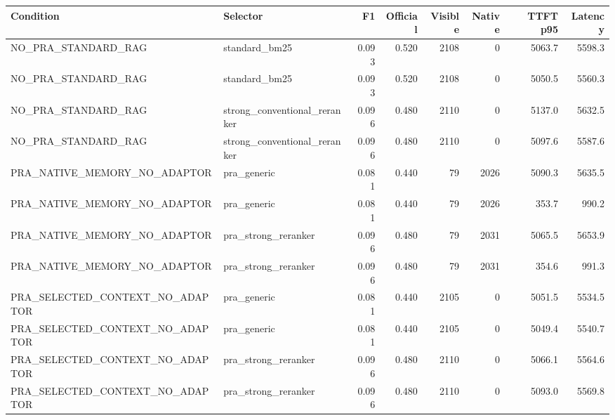 \begin{tabular}{llrrrrrr}
\toprule
Condition & Selector & F1 & Official & Visible & Native & TTFT p95 & Latency \\
\midrule
NO\_PRA\_STANDARD\_RAG & standard\_bm25 & 0.093 & 0.520 & 2108 & 0 & 5063.7 & 5598.3 \\
NO\_PRA\_STANDARD\_RAG & standard\_bm25 & 0.093 & 0.520 & 2108 & 0 & 5050.5 & 5560.3 \\
NO\_PRA\_STANDARD\_RAG & strong\_conventional\_reranker & 0.096 & 0.480 & 2110 & 0 & 5137.0 & 5632.5 \\
NO\_PRA\_STANDARD\_RAG & strong\_conventional\_reranker & 0.096 & 0.480 & 2110 & 0 & 5097.6 & 5587.6 \\
PRA\_NATIVE\_MEMORY\_NO\_ADAPTOR & pra\_generic & 0.081 & 0.440 & 79 & 2026 & 5090.3 & 5635.5 \\
PRA\_NATIVE\_MEMORY\_NO\_ADAPTOR & pra\_generic & 0.081 & 0.440 & 79 & 2026 & 353.7 & 990.2 \\
PRA\_NATIVE\_MEMORY\_NO\_ADAPTOR & pra\_strong\_reranker & 0.096 & 0.480 & 79 & 2031 & 5065.5 & 5653.9 \\
PRA\_NATIVE\_MEMORY\_NO\_ADAPTOR & pra\_strong\_reranker & 0.096 & 0.480 & 79 & 2031 & 354.6 & 991.3 \\
PRA\_SELECTED\_CONTEXT\_NO\_ADAPTOR & pra\_generic & 0.081 & 0.440 & 2105 & 0 & 5051.5 & 5534.5 \\
PRA\_SELECTED\_CONTEXT\_NO\_ADAPTOR & pra\_generic & 0.081 & 0.440 & 2105 & 0 & 5049.4 & 5540.7 \\
PRA\_SELECTED\_CONTEXT\_NO\_ADAPTOR & pra\_strong\_reranker & 0.096 & 0.480 & 2110 & 0 & 5066.1 & 5564.6 \\
PRA\_SELECTED\_CONTEXT\_NO\_ADAPTOR & pra\_strong\_reranker & 0.096 & 0.480 & 2110 & 0 & 5093.0 & 5569.8 \\
\bottomrule
\end{tabular}

